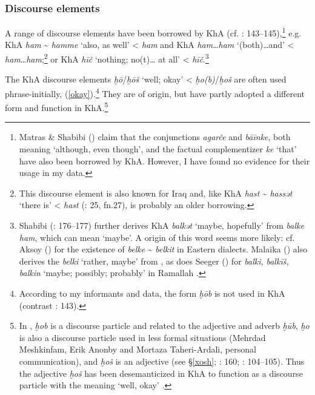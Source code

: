 \documentclass[output=paper,nonflat]{langsci/langscibook}
\begin{document}

\subsubsection{Discourse elements}

A range of  discourse elements have been borrowed by KhA (cf. \citealt{MatrasShabibi2007}: 143–145),\footnote{Matras \& Shabibi (\citeyear[144]{MatrasShabibi2007}) claim that the  conjunctions \textit{agarče} and \textit{bāīnke}, both meaning ‘although, even though’, and the  factual {complementizer} \textit{ke} ‘that’ have also been borrowed by KhA. However, I have found no evidence for their usage in my data.} e.g. KhA \textit{ham} \~{} \textit{hamme} ‘also, as well’ <  \textit{ham} and KhA \textit{ham}…\textit{ham} ‘(both)…and’ <  \textit{ham}…\textit{ham};\footnote{This discourse element is also known for Iraq \citep[36]{Malaika1963} and, like KhA \textit{hast} \~{} \textit{hassət} ‘there is’ <  \textit{hast} (\citealt{Ingham1973}: 25, fn.27), is probably an older borrowing.} or KhA \textit{hīč} ‘nothing; no(t)… at all’ <  \textit{hīč}.\footnote{Shabibi (\citeyear{Shabibi2006}: 176–177) further derives KhA \textit{balkət} ‘maybe, hopefully’ from  \textit{balke} \textit{ham}, which can mean ‘maybe’. A  origin of this word seems more likely: cf. Aksoy (\citeyear[620]{Aksoy1963}) for the existence of \textit{belke} \~{} \textit{belkit} in Eastern  dialects. Malaika (\citeyear[35]{Malaika1963}) also derives the   \textit{belki} ‘rather, maybe’ from , as does Seeger (\citeyear[28]{Seeger2009}) for \textit{balki,} \textit{balkīš,} \textit{balkin} ‘maybe; possibly; probably’ in Ramallah .} 

The KhA discourse elements \textit{ḫō}/\textit{ḫōš} ‘well; okay’ <  \textit{ḫo(b)}/\textit{ḫoš} are often used phrase-initially, (\ref{okay}).\footnote{According to my informants and data, the form \textit{ḫōb} is not used in KhA (contrast \citealt{MatrasShabibi2007}: 143).} They are of  origin, but have partly adopted a different form and function in KhA.\footnote{In , \textit{ḫob} is a discourse particle and related to the adjective and adverb \textit{ḫūb}, \textit{ḫo} is also a discourse particle used in less formal situations (Mehrdad Meshkinfam, Erik Anonby and Mortaza Taheri-Ardali, personal communication), and \textit{ḫoš} is an adjective (see §\ref{xosh}; \citealt{Shabibi2006}: 160; \citealt{Mohammadi2018}: 104--105). Thus the  adjective \textit{ḫoš} has been desemanticized in KhA to function as a discourse particle with the meaning ‘well, okay’ \citep[160]{Shabibi2006}.}
\end{document}
